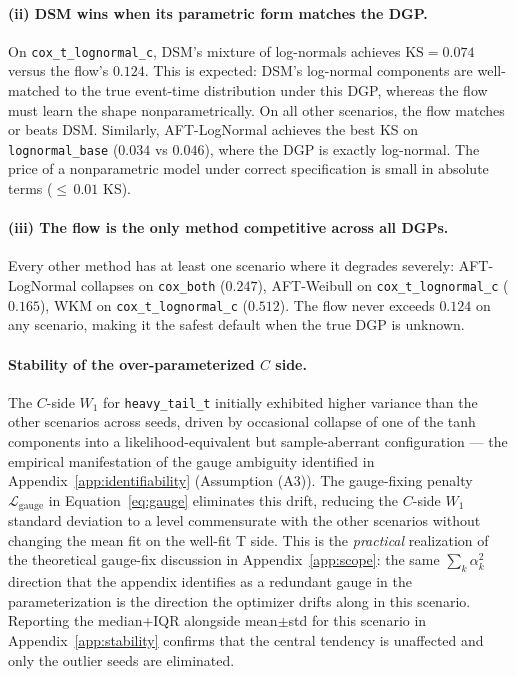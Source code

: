 \paragraph{(ii) DSM wins when its parametric form matches the DGP.}
On \texttt{cox\_t\_lognormal\_c}, DSM's mixture of log-normals achieves
$\mathrm{KS} = 0.074$ versus the flow's $0.124$. This is expected:
DSM's log-normal components are well-matched to the true event-time
distribution under this DGP, whereas the flow must learn the shape
nonparametrically. On all other scenarios, the flow matches or beats DSM.
Similarly, AFT-LogNormal achieves the best KS on \texttt{lognormal\_base}
($0.034$ vs $0.046$), where the DGP is exactly log-normal.
The price of a nonparametric model under correct specification is small
in absolute terms (${\leq}\,0.01$ KS).

\paragraph{(iii) The flow is the only method competitive across all DGPs.}
Every other method has at least one scenario where it degrades severely:
AFT-LogNormal collapses on \texttt{cox\_both} ($0.247$), AFT-Weibull on
\texttt{cox\_t\_lognormal\_c} ($0.165$), WKM on
\texttt{cox\_t\_lognormal\_c} ($0.512$). The flow never exceeds $0.124$
on any scenario, making it the safest default when the true DGP is
unknown.

\paragraph{Stability of the over-parameterized $C$ side.}
The $C$-side $W_1$ for \texttt{heavy\_tail\_t} initially exhibited higher
variance than the other scenarios across seeds, driven by occasional
collapse of one of the tanh components into a likelihood-equivalent but
sample-aberrant configuration --- the empirical manifestation of the gauge
ambiguity identified in Appendix~\ref{app:identifiability} (Assumption
(A3)). The gauge-fixing penalty $\mathcal{L}_{\text{gauge}}$ in
Equation~\eqref{eq:gauge} eliminates this drift, reducing the $C$-side
$W_1$ standard deviation to a level commensurate with the other scenarios
without changing the mean fit on the well-fit T side. This is the
\emph{practical} realization of the theoretical gauge-fix
discussion in Appendix~\ref{app:scope}: the same $\sum_k \alpha_k^2$
direction that the appendix identifies as a redundant gauge in the
parameterization is the direction the optimizer drifts along in this
scenario. Reporting the median+IQR alongside mean$\pm$std for this
scenario in Appendix~\ref{app:stability} confirms that the central
tendency is unaffected and only the outlier seeds are eliminated.

